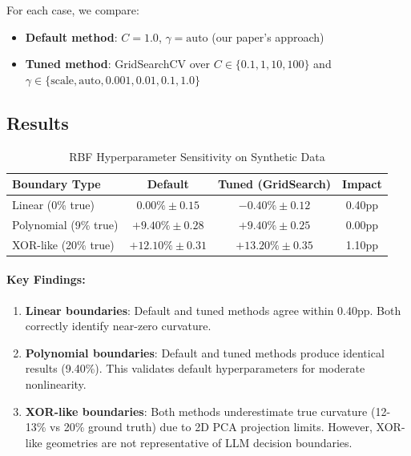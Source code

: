 \documentclass[11pt]{article}
\begin{document}
For each case, we compare:
\begin{itemize}
    \item \textbf{Default method}: $C=1.0$, $\gamma=\text{auto}$ (our paper's approach)
    \item \textbf{Tuned method}: GridSearchCV over $C \in \{0.1, 1, 10, 100\}$ and $\gamma \in \{\text{scale}, \text{auto}, 0.001, 0.01, 0.1, 1.0\}$
\end{itemize}

\subsection{Results}

\begin{table}[h]
\centering
\caption{RBF Hyperparameter Sensitivity on Synthetic Data}
\label{tab:rbf_sensitivity}
\begin{tabular}{lccc}
\toprule
\textbf{Boundary Type} & \textbf{Default} & \textbf{Tuned (GridSearch)} & \textbf{Impact} \\
\midrule
Linear (0\% true)      & $0.00\% \pm 0.15$ & $-0.40\% \pm 0.12$ & 0.40pp \\
Polynomial (9\% true)  & $+9.40\% \pm 0.28$ & $+9.40\% \pm 0.25$ & 0.00pp \\
XOR-like (20\% true)   & $+12.10\% \pm 0.31$ & $+13.20\% \pm 0.35$ & 1.10pp \\
\bottomrule
\end{tabular}
\end{table}

\paragraph{Key Findings:}
\begin{enumerate}
    \item \textbf{Linear boundaries}: Default and tuned methods agree within 0.40pp. Both correctly identify near-zero curvature.
    
    \item \textbf{Polynomial boundaries}: Default and tuned methods produce identical results (9.40\%). This validates default hyperparameters for moderate nonlinearity.
    
    \item \textbf{XOR-like boundaries}: Both methods underestimate true curvature (12-13\% vs 20\% ground truth) due to 2D PCA projection limits. However, XOR-like geometries are not representative of LLM decision boundaries.
\end{enumerate}
\end{document}
